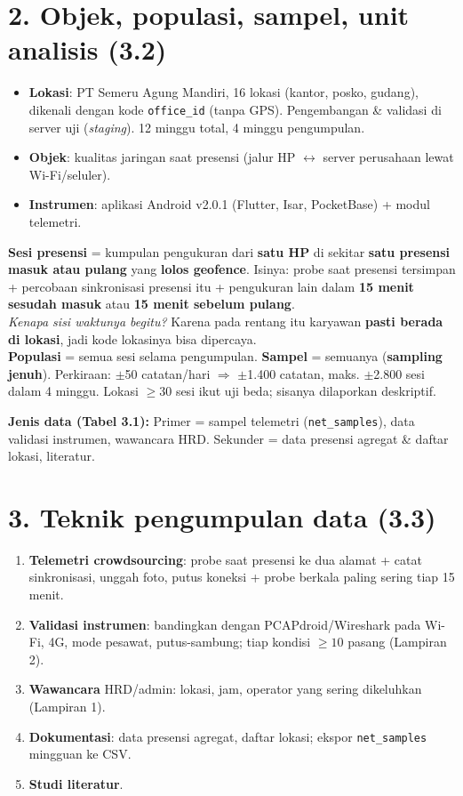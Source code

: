 \section*{2. Objek, populasi, sampel, unit analisis (3.2)}
\begin{itemize}
  \item \textbf{Lokasi}: PT Semeru Agung Mandiri, 16 lokasi (kantor, posko, gudang), dikenali dengan kode \texttt{office\_id} (tanpa GPS). Pengembangan \& validasi di server uji (\textit{staging}). 12 minggu total, 4 minggu pengumpulan.
  \item \textbf{Objek}: kualitas jaringan saat presensi (jalur HP $\leftrightarrow$ server perusahaan lewat Wi-Fi/seluler).
  \item \textbf{Instrumen}: aplikasi Android v2.0.1 (Flutter, Isar, PocketBase) + modul telemetri.
\end{itemize}
\begin{hafal}
\textbf{Sesi presensi} = kumpulan pengukuran dari \textbf{satu HP} di sekitar \textbf{satu presensi masuk atau pulang} yang \textbf{lolos geofence}. Isinya: probe saat presensi tersimpan + percobaan sinkronisasi presensi itu + pengukuran lain dalam \textbf{15 menit sesudah masuk} atau \textbf{15 menit sebelum pulang}.\\[3pt]
\textit{Kenapa sisi waktunya begitu?} Karena pada rentang itu karyawan \textbf{pasti berada di lokasi}, jadi kode lokasinya bisa dipercaya.\\[3pt]
\textbf{Populasi} = semua sesi selama pengumpulan. \textbf{Sampel} = semuanya (\textbf{sampling jenuh}). Perkiraan: $\pm$50 catatan/hari $\Rightarrow$ $\pm$1.400 catatan, maks. $\pm$2.800 sesi dalam 4 minggu. Lokasi $\geq 30$ sesi ikut uji beda; sisanya dilaporkan deskriptif.
\end{hafal}

\textbf{Jenis data (Tabel 3.1):} Primer = sampel telemetri (\texttt{net\_samples}), data validasi instrumen, wawancara HRD. Sekunder = data presensi agregat \& daftar lokasi, literatur.

\section*{3. Teknik pengumpulan data (3.3)}
\begin{enumerate}
  \item \textbf{Telemetri crowdsourcing}: probe saat presensi ke dua alamat + catat sinkronisasi, unggah foto, putus koneksi + probe berkala paling sering tiap 15 menit.
  \item \textbf{Validasi instrumen}: bandingkan dengan PCAPdroid/Wireshark pada Wi-Fi, 4G, mode pesawat, putus-sambung; tiap kondisi $\geq 10$ pasang (Lampiran 2).
  \item \textbf{Wawancara} HRD/admin: lokasi, jam, operator yang sering dikeluhkan (Lampiran 1).
  \item \textbf{Dokumentasi}: data presensi agregat, daftar lokasi; ekspor \texttt{net\_samples} mingguan ke CSV.
  \item \textbf{Studi literatur}.
\end{enumerate}

